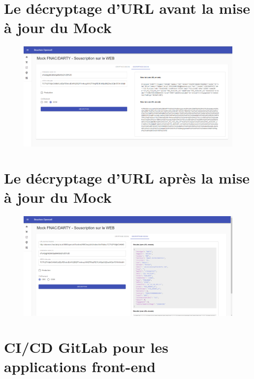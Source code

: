 \documentclass[12pt, a4paper]{report}
\begin{document}
	\begin{landscape}
	\label{sec:organigramme}
	
	\newpage
	\section{Le décryptage d'URL avant la mise à jour du Mock}
	\label{sec:mock_before}
	\begin{figure}[!h]
		\centering
		\includegraphics[width=1.45\textwidth]{assets/images/mock_before.png}
	\end{figure}

	\newpage
	\section{Le décryptage d'URL après la mise à jour du Mock}
	\label{sec:mock_after}
	\begin{figure}[!h]
		\centering
		\includegraphics[width=1.45\textwidth]{assets/images/mock_after.png}
	\end{figure}

	\end{landscape}

	\section{CI/CD GitLab pour les applications front-end}
	\label{sec:ci-cd_gitlab}
	
\end{document}
